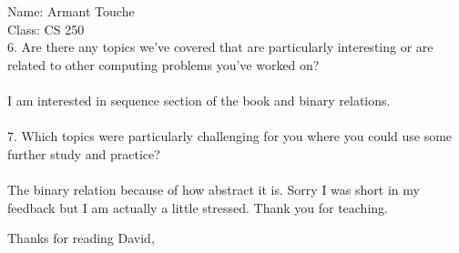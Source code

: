 \documentclass{letter}
\begin{document}
\begin{letter}{Name: Armant Touche \\ Class: CS 250 
\\ }
6. Are there any topics we've covered that are particularly interesting or are related to other computing problems you've worked on?\\\\
I am interested in sequence section of the book and binary relations.\\\\
7.  Which topics  were  particularly  challenging  for  you  where  you  could  use  some  further study and practice?\\\\
The binary relation because of how abstract it is. Sorry I was short in my feedback but I am actually a little stressed. Thank you for teaching.


\closing{Thanks for reading David,}

\end{letter}
\end{document}
